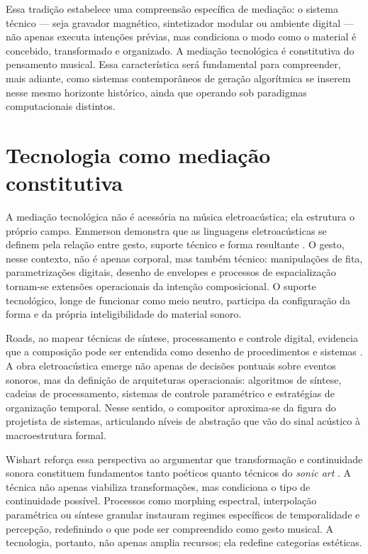 Essa tradição estabelece uma compreensão específica de mediação: o sistema técnico — seja gravador magnético, sintetizador modular ou ambiente digital — não apenas executa intenções prévias, mas condiciona o modo como o material é concebido, transformado e organizado. A mediação tecnológica é constitutiva do pensamento musical. Essa característica será fundamental para compreender, mais adiante, como sistemas contemporâneos de geração algorítmica se inserem nesse mesmo horizonte histórico, ainda que operando sob paradigmas computacionais distintos.

\section{Tecnologia como mediação constitutiva}

A mediação tecnológica não é acessória na música eletroacústica; ela estrutura o próprio campo. Emmerson demonstra que as linguagens eletroacústicas se definem pela relação entre gesto, suporte técnico e forma resultante \cite{emmerson1986language}. O gesto, nesse contexto, não é apenas corporal, mas também técnico: manipulações de fita, parametrizações digitais, desenho de envelopes e processos de espacialização tornam-se extensões operacionais da intenção composicional. O suporte tecnológico, longe de funcionar como meio neutro, participa da configuração da forma e da própria inteligibilidade do material sonoro.

Roads, ao mapear técnicas de síntese, processamento e controle digital, evidencia que a composição pode ser entendida como desenho de procedimentos e sistemas \cite{roads1996computermusictutorial}. A obra eletroacústica emerge não apenas de decisões pontuais sobre eventos sonoros, mas da definição de arquiteturas operacionais: algoritmos de síntese, cadeias de processamento, sistemas de controle paramétrico e estratégias de organização temporal. Nesse sentido, o compositor aproxima-se da figura do projetista de sistemas, articulando níveis de abstração que vão do sinal acústico à macroestrutura formal.

Wishart reforça essa perspectiva ao argumentar que transformação e continuidade sonora constituem fundamentos tanto poéticos quanto técnicos do \emph{sonic art} \cite{wishart1996sonicart}. A técnica não apenas viabiliza transformações, mas condiciona o tipo de continuidade possível. Processos como morphing espectral, interpolação paramétrica ou síntese granular instauram regimes específicos de temporalidade e percepção, redefinindo o que pode ser compreendido como gesto musical. A tecnologia, portanto, não apenas amplia recursos; ela redefine categorias estéticas.

